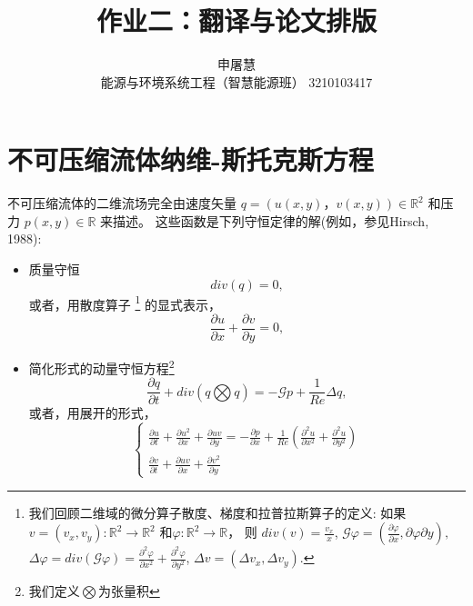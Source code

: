 \documentclass{ctexart}
\title{作业二：翻译与论文排版}
\author{申屠慧\\能源与环境系统工程（智慧能源班） 3210103417}
\begin{document}
\maketitle

\section{不可压缩流体纳维-斯托克斯方程}
不可压缩流体的二维流场完全由速度矢量 
$ q = (u(x,y)， v(x,y)) \in \mathbb{R}^2 $ 
和压力 $ p(x,y) \in \mathbb{R} $ 来描述。\cite{danaila2007introduction}
这些函数是下列守恒定律的解(例如，参见Hirsch, 1988):
\begin{itemize}
    \item 质量守恒
        \begin{equation} \label{eq:mass}
        div(q)=0,
        \end{equation}
    或者，用散度算子
    \footnote{我们回顾二维域的微分算子散度、梯度和拉普拉斯算子的定义:
    如果 $ v = (v_x,v_y): \mathbb{R}^2\rightarrow \mathbb{R}^2$
    和$\varphi :\mathbb{R}^2 \rightarrow \mathbb{R} $，
    则 $ div(v) = \frac{v_x}{x} $,   
    $\mathcal{G} \varphi = (\frac{\partial \varphi}{\partial x}, {\partial \varphi}{\partial y}),$  
    $\Delta \varphi = div(\mathcal{G}\varphi) = \frac{\partial^2 \varphi}{\partial x^2} + \frac{\partial^2 \varphi}{\partial y^2}$, 
    $\Delta v = (\Delta v_x, \Delta v_y)$.}
    的显式表示，
        \begin{equation} \label{eq:masse}
        \frac{\partial u}{\partial x} + \frac{\partial v}{\partial y} = 0,
        \end{equation}
    \item 简化形式的动量守恒方程\footnote{我们定义$\bigotimes$为张量积}
        \begin{equation} \label{eq:moment}
            \frac{\partial q}{\partial t} + div(q \bigotimes q) = -\mathcal{G}p + \frac{1}{Re} \Delta q, 
        \end{equation}
        或者，用展开的形式，
        \begin{equation} \label{eq:momente}
        \left\{
        \begin{array}{ll}
        \frac{\partial u}{\partial t} + \frac{\partial u^2}{\partial x} + \frac{\partial uv}{\partial y}
         = -\frac{\partial p}{\partial x} + \frac{1}{Re} ( \frac{\partial^2 u}{\partial x^2} + \frac{\partial^2 u}{\partial y^2}) \\
        \frac{\partial v}{\partial t} + \frac{\partial uv}{\partial x} + \frac{\partial v^2}{\partial y}

\end{array}
\end{equation}
\end{itemize}
\end{document}

